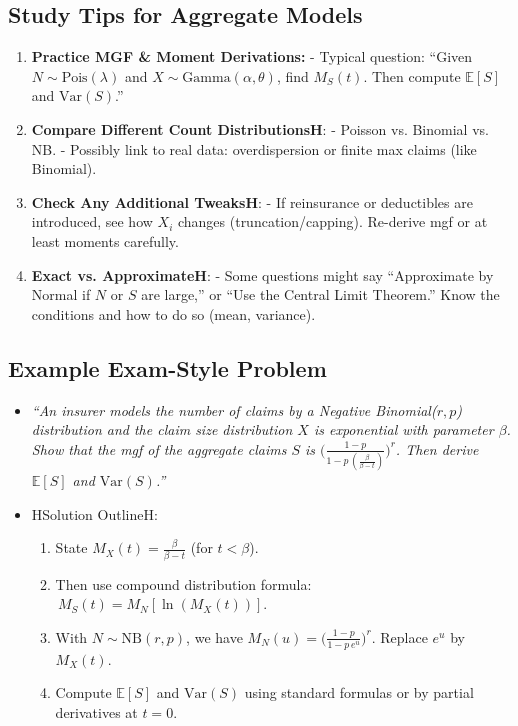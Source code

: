 \documentclass[13pt,a4paper]{article}
\begin{document}
\subsection{Study Tips for Aggregate Models}
\begin{enumerate}
  \item \textbf{Practice MGF \& Moment Derivations:}
    - Typical question: “Given \(N\sim \mathrm{Pois}(\lambda)\) and \(X\sim \mathrm{Gamma}(\alpha,\theta)\), find \(M_S(t)\). Then compute \(\mathbb{E}[S]\) and \(\mathrm{Var}(S)\).”
  \item \textbf{Compare Different Count DistributionsH}:
    - Poisson vs. Binomial vs. NB.  
    - Possibly link to real data: overdispersion or finite max claims (like Binomial).
  \item \textbf{Check Any Additional TweaksH}:
    - If reinsurance or deductibles are introduced, see how \(X_i\) changes (truncation/capping). Re-derive mgf or at least moments carefully.
  \item \textbf{Exact vs. ApproximateH}:
    - Some questions might say “Approximate by Normal if \(N\) or \(S\) are large,” or “Use the Central Limit Theorem.” Know the conditions and how to do so (mean, variance).
\end{enumerate}

\subsection{Example Exam-Style Problem}
\begin{itemize}
  \item \emph{“An insurer models the number of claims by a Negative Binomial(\(r,p\)) distribution and the claim size distribution \(X\) is exponential with parameter \(\beta\). Show that the mgf of the aggregate claims \(S\) is \(\bigl(\frac{1-p}{1-p\,(\frac{\beta}{\beta - t})}\bigr)^r\). Then derive \(\mathbb{E}[S]\) and \(\mathrm{Var}(S)\).”}
  \item HSolution OutlineH:
    \begin{enumerate}
      \item State \(M_X(t)=\frac{\beta}{\beta - t}\) (for \(t<\beta\)).  
      \item Then use compound distribution formula: 
        \(\,M_S(t)=M_N[\ln(M_X(t))]\).  
      \item With \(N\sim \mathrm{NB}(r,p)\), we have \(M_N(u)=\bigl(\frac{1-p}{1-p\,e^u}\bigr)^r\). Replace \(e^u\) by \(M_X(t)\).  
      \item Compute \(\mathbb{E}[S]\) and \(\mathrm{Var}(S)\) using standard formulas or by partial derivatives at \(t=0\).
    \end{enumerate}
\end{itemize}
\end{document}
